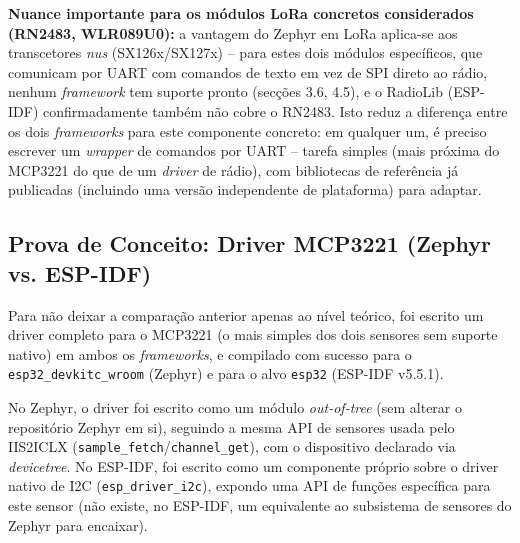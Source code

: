 \documentclass[a4paper,12pt]{article}
\begin{document}
\textbf{Nuance importante para os módulos LoRa concretos considerados (RN2483, WLR089U0):} a vantagem do Zephyr em LoRa aplica-se aos transcetores \textit{nus} (SX126x/SX127x) -- para estes dois módulos específicos, que comunicam por UART com comandos de texto em vez de SPI direto ao rádio, nenhum \textit{framework} tem suporte pronto (secções 3.6, 4.5), e o RadioLib (ESP-IDF) confirmadamente também não cobre o RN2483. Isto reduz a diferença entre os dois \textit{frameworks} para este componente concreto: em qualquer um, é preciso escrever um \textit{wrapper} de comandos por UART -- tarefa simples (mais próxima do MCP3221 do que de um \textit{driver} de rádio), com bibliotecas de referência já publicadas (incluindo uma versão independente de plataforma) para adaptar.

\subsection{Prova de Conceito: Driver MCP3221 (Zephyr vs. ESP-IDF)}
Para não deixar a comparação anterior apenas ao nível teórico, foi escrito um driver completo para o MCP3221 (o mais simples dos dois sensores sem suporte nativo) em ambos os \textit{frameworks}, e compilado com sucesso para o \texttt{esp32\_devkitc\_wroom} (Zephyr) e para o alvo \texttt{esp32} (ESP-IDF v5.5.1).

No Zephyr, o driver foi escrito como um módulo \textit{out-of-tree} (sem alterar o repositório Zephyr em si), seguindo a mesma API de sensores usada pelo IIS2ICLX (\texttt{sample\_fetch}/\texttt{channel\_get}), com o dispositivo declarado via \textit{devicetree}. No ESP-IDF, foi escrito como um componente próprio sobre o driver nativo de I2C (\texttt{esp\_driver\_i2c}), expondo uma API de funções específica para este sensor (não existe, no ESP-IDF, um equivalente ao subsistema de sensores do Zephyr para encaixar).

\begin{center}
\end{center}
\end{document}
